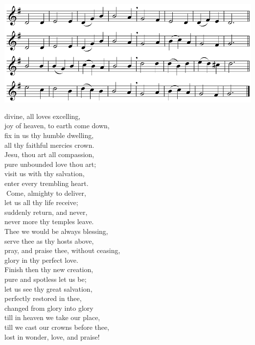 \begin{center}

\includegraphics[width=.8\textwidth]{hymn3.png}

 divine, all loves excelling,\\
\qquad joy of heaven, to earth come down,\\
fix in us thy humble dwelling,\\
all thy faithful mercies crown.\\
Jesu, thou art all compassion,\\
pure unbounded love thou art;\\
visit us with thy salvation,\\
enter every trembling heart.\\

Come, almighty to deliver,\\
let us all thy life receive;\\
suddenly return, and never,\\
never more thy temples leave.\\
Thee we would be always blessing,\\
serve thee as thy hosts above,\\
pray, and praise thee, without ceasing,\\
glory in thy perfect love.\\
Finish then thy new creation,\\
pure and spotless let us be;\\
let us see thy great salvation,\\
perfectly restored in thee,\\
changed from glory into glory\\
till in heaven we take our place,\\
till we cast our crowns before thee,\\
lost in wonder, love, and praise!
\end{center}

